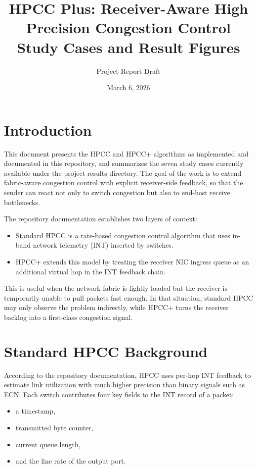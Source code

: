 \documentclass[11pt,a4paper]{article}
\title{HPCC Plus: Receiver-Aware High Precision Congestion Control\\Study Cases and Result Figures}
\author{Project Report Draft}
\date{March 6, 2026}
\begin{document}
\maketitle
\tableofcontents
\newpage

\section{Introduction}

This document presents the HPCC and HPCC+ algorithms as implemented and documented in this repository, and summarizes the seven study cases currently available under the project results directory. The goal of the work is to extend fabric-aware congestion control with explicit receiver-side feedback, so that the sender can react not only to switch congestion but also to end-host receive bottlenecks.

The repository documentation establishes two layers of context:

\begin{itemize}
    \item Standard HPCC is a rate-based congestion control algorithm that uses in-band network telemetry (INT) inserted by switches.
    \item HPCC+ extends this model by treating the receiver NIC ingress queue as an additional virtual hop in the INT feedback chain.
\end{itemize}

This is useful when the network fabric is lightly loaded but the receiver is temporarily unable to pull packets fast enough. In that situation, standard HPCC may only observe the problem indirectly, while HPCC+ turns the receiver backlog into a first-class congestion signal.

\section{Standard HPCC Background}

According to the repository documentation, HPCC uses per-hop INT feedback to estimate link utilization with much higher precision than binary signals such as ECN. Each switch contributes four key fields to the INT record of a packet:

\begin{itemize}
    \item a timestamp,
    \item transmitted byte counter,
    \item current queue length,
    \item and the line rate of the output port.
\end{itemize}
\end{document}
